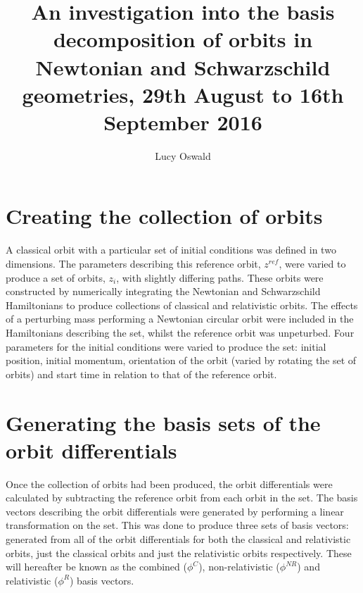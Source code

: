 \documentclass[11pt,a4paper]{article}
\begin{document}

\title{\textbf{An investigation into the basis decomposition of orbits in Newtonian and Schwarzschild geometries, 29th August to 16th September 2016}}
\author{Lucy Oswald}
\date{}
\maketitle


\section{Creating the collection of orbits}

A classical orbit with a particular set of initial conditions was defined in two dimensions. The parameters describing this reference orbit, $z^{ref}$, were varied to produce a set of orbits, $z_{i}$, with slightly differing paths. These orbits were constructed by numerically integrating the Newtonian and Schwarzschild Hamiltonians to produce collections of classical and relativistic orbits. The effects of a perturbing mass performing a Newtonian circular orbit were included in the Hamiltonians describing the set, whilst the reference orbit was unpeturbed. Four parameters for the initial conditions were varied to produce the set: initial position, initial momentum, orientation of the orbit (varied by rotating the set of orbits) and start time in relation to that of the reference orbit.

\section{Generating the basis sets of the orbit differentials}

Once the collection of orbits had been produced, the orbit differentials were calculated by subtracting the reference orbit from each orbit in the set. The basis vectors describing the orbit differentials were generated by performing a linear transformation on the set. This was done to produce three sets of basis vectors: generated from all of the orbit differentials for both the classical and relativistic orbits, just the classical orbits and just the relativistic orbits respectively. These will hereafter be known as the combined ($\phi^C$), non-relativistic ($\phi^{NR}$) and relativistic ($\phi^R$) basis vectors.
\end{document}
